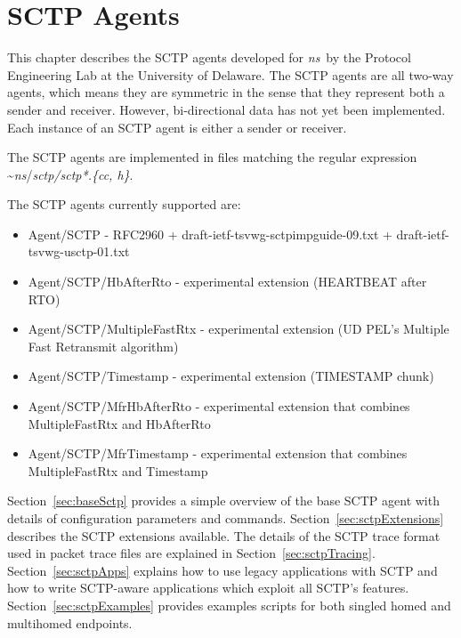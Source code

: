\chapter{SCTP Agents}
\label{sec:sctpAgents}

   This chapter describes the SCTP agents developed for \emph{ns}~by the
   Protocol Engineering Lab at the University of Delaware.  The SCTP
   agents are all two-way agents, which means they are symmetric in the
   sense that they represent both a sender and receiver. However,
   bi-directional data has not yet been implemented. Each instance of an
   SCTP agent is either a sender or receiver.

   The SCTP agents are implemented in files matching the regular
   expression \textasciitilde\emph{ns}/{\em{sctp/sctp*.\{cc, h\}}}.

   The SCTP agents currently supported are:

   \begin{itemize}\itemsep0pt

      \item Agent/SCTP - RFC2960 + draft-ietf-tsvwg-sctpimpguide-09.txt
       + draft-ietf-tsvwg-usctp-01.txt 

      \item Agent/SCTP/HbAfterRto - experimental extension (HEARTBEAT
      after RTO)

      \item Agent/SCTP/MultipleFastRtx - experimental extension (UD PEL's
      Multiple Fast Retransmit algorithm)

      \item Agent/SCTP/Timestamp - experimental extension (TIMESTAMP chunk)

      \item Agent/SCTP/MfrHbAfterRto - experimental extension that
      combines MultipleFastRtx and HbAfterRto

      \item Agent/SCTP/MfrTimestamp - experimental extension that
      combines MultipleFastRtx and Timestamp

   \end{itemize}

   Section~\ref{sec:baseSctp} provides a simple overview of the base SCTP
   agent with details of configuration parameters and
   commands. Section~\ref{sec:sctpExtensions} describes the SCTP
   extensions available. The details of the SCTP trace format used in
   packet trace files are explained in
   Section~\ref{sec:sctpTracing}. Section~\ref{sec:sctpApps} explains how
   to use legacy applications with SCTP and how to write SCTP-aware
   applications which exploit all SCTP's
   features. Section~\ref{sec:sctpExamples} provides examples scripts for
   both singled homed and multihomed endpoints.

